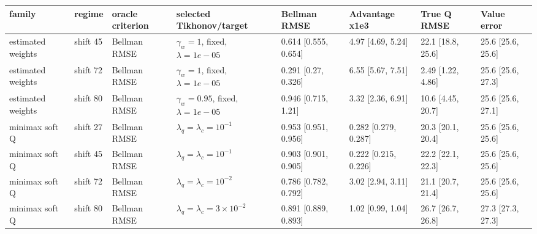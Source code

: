 \begin{tabular}{llllllll}
\toprule
family & regime & oracle criterion & selected Tikhonov/target & Bellman RMSE & Advantage x1e3 & True Q RMSE & Value error \\
\midrule
estimated weights & shift 45 & Bellman RMSE & $\gamma_w=1$, fixed, $\lambda=1e-05$ & 0.614 [0.555, 0.654] & 4.97 [4.69, 5.24] & 22.1 [18.8, 25.6] & 25.6 [25.6, 25.6] \\
estimated weights & shift 72 & Bellman RMSE & $\gamma_w=1$, fixed, $\lambda=1e-05$ & 0.291 [0.27, 0.326] & 6.55 [5.67, 7.51] & 2.49 [1.22, 4.86] & 25.6 [25.6, 27.3] \\
estimated weights & shift 80 & Bellman RMSE & $\gamma_w=0.95$, fixed, $\lambda=1e-05$ & 0.946 [0.715, 1.21] & 3.32 [2.36, 6.91] & 10.6 [4.45, 20.7] & 25.6 [25.6, 27.1] \\
minimax soft Q & shift 27 & Bellman RMSE & $\lambda_q=\lambda_c=10^{-1}$ & 0.953 [0.951, 0.956] & 0.282 [0.279, 0.287] & 20.3 [20.1, 20.4] & 25.6 [25.6, 25.6] \\
minimax soft Q & shift 45 & Bellman RMSE & $\lambda_q=\lambda_c=10^{-1}$ & 0.903 [0.901, 0.905] & 0.222 [0.215, 0.226] & 22.2 [22.1, 22.3] & 25.6 [25.6, 25.6] \\
minimax soft Q & shift 72 & Bellman RMSE & $\lambda_q=\lambda_c=10^{-2}$ & 0.786 [0.782, 0.792] & 3.02 [2.94, 3.11] & 21.1 [20.7, 21.4] & 25.6 [25.6, 25.6] \\
minimax soft Q & shift 80 & Bellman RMSE & $\lambda_q=\lambda_c=3\times 10^{-2}$ & 0.891 [0.889, 0.893] & 1.02 [0.99, 1.04] & 26.7 [26.7, 26.8] & 27.3 [27.3, 27.3] \\
\bottomrule
\end{tabular}
